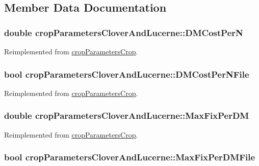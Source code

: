\subsection{Member Data Documentation}
\hypertarget{classcrop_parameters_clover_and_lucerne_a773a03ccc9dd5d91252c10d77919daf8}{
\subsubsection[{DMCostPerN}]{\setlength{\rightskip}{0pt plus 5cm}double {\bf cropParametersCloverAndLucerne::DMCostPerN}}}
\label{classcrop_parameters_clover_and_lucerne_a773a03ccc9dd5d91252c10d77919daf8}


Reimplemented from \hyperlink{classcrop_parameters_crop_ac22d342576a5f3f5f769dd1dedaaa391}{cropParametersCrop}.\hypertarget{classcrop_parameters_clover_and_lucerne_a2f07df5186a02c4549c039622e3485aa}{
\subsubsection[{DMCostPerNFile}]{\setlength{\rightskip}{0pt plus 5cm}bool {\bf cropParametersCloverAndLucerne::DMCostPerNFile}}}
\label{classcrop_parameters_clover_and_lucerne_a2f07df5186a02c4549c039622e3485aa}


Reimplemented from \hyperlink{classcrop_parameters_crop_a453e9378c9d3abae8b3b23ac4416bf64}{cropParametersCrop}.\hypertarget{classcrop_parameters_clover_and_lucerne_ac9b0d4522d96df75432927362a7e1bd9}{
\subsubsection[{MaxFixPerDM}]{\setlength{\rightskip}{0pt plus 5cm}double {\bf cropParametersCloverAndLucerne::MaxFixPerDM}}}
\label{classcrop_parameters_clover_and_lucerne_ac9b0d4522d96df75432927362a7e1bd9}


Reimplemented from \hyperlink{classcrop_parameters_crop_ad3c7743c096df81c1328482d475c30fc}{cropParametersCrop}.\hypertarget{classcrop_parameters_clover_and_lucerne_a39a5d4684180915dd9e63fd19680dc74}{
\subsubsection[{MaxFixPerDMFile}]{\setlength{\rightskip}{0pt plus 5cm}bool {\bf cropParametersCloverAndLucerne::MaxFixPerDMFile}}}
\label{classcrop_parameters_clover_and_lucerne_a39a5d4684180915dd9e63fd19680dc74}


